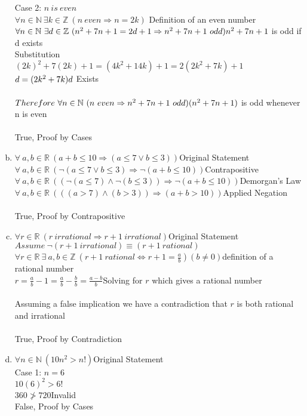 \documentclass[11pt,letterpaper]{article}
\begin{document}
\begin{enumerate}[(a)]
Case 2: $n~is~even$\\
$\forall n\in\mathbb{N}~\exists k\in\mathbb{Z}~(n~even\Rightarrow n =2k)$ \hfill Definition of an even number\\
$\forall n\in\mathbb{N}~\exists d\in\mathbb{Z}~(n^2+7n+1 = 2d+1 \Rightarrow n^2+7n+1~odd)\hfill n^2+7n+1$ is odd if d exists\\
Substitution\\
$(2k)^2 + 7(2k) + 1 = (4k^2 + 14k) + 1 = 2(2k^2 + 7k) + 1$\\
$d = (2k^2 + 7k)\hfill d$ Exists\\
\\
$Therefore~\forall n\in\mathbb{N}~(n~even\Rightarrow n^2 +7n +1~odd)\hfill (n^2 +7n +1)$ is odd whenever n is even\\
\\
True, Proof by Cases
\\
\item
$\forall ~a,b\in\mathbb{R}~(a+b\leq 10\Rightarrow (a\leq 7 \vee b\leq 3))$\hfill Original Statement\\
$\forall ~a,b\in\mathbb{R}~(\neg(a\leq 7 \vee b\leq 3) \Rightarrow \neg(a+b\leq 10))$\hfill Contrapositive\\
$\forall ~a,b\in\mathbb{R}~((\neg(a\leq 7) \wedge \neg(b\leq 3)) \Rightarrow \neg(a+b\leq 10))$\hfill Demorgan's Law\\
$\forall ~a,b\in\mathbb{R}~(((a> 7) \wedge (b> 3)) \Rightarrow (a+b> 10))$\hfill Applied Negation\\
\\
True, Proof by Contrapositive
\clearpage

\item
$\forall r\in\mathbb{R}~(r~irrational\Rightarrow r+1~irrational)$\hfill Original Statement\\
$Assume~\neg(r+1~irrational)\equiv (r+1~rational)$\\
$\forall r\in\mathbb{R}~\exists~a,b\in\mathbb{Z}~(r+1~rational\Leftrightarrow r+1=\frac{a}{b})(b\neq 0)$\hfill definition of a rational number\\
$r= \frac{a}{b}-1=\frac{a}{b}-\frac{b}{b}=\frac{a-b}{b}$\hfill Solving for $r$ which gives a rational number\\
\\
Assuming a false implication we have a contradiction that $r$ is both rational and irrational\\
\\
True, Proof by Contradiction
\\
\item
$\forall n\in\mathbb{N}~(10n^2>n!)$\hfill Original Statement\\
Case 1: $n=6$\\
$10(6)^2 > 6!$\\
$360 \not> 720$\hfill Invalid\\

False, Proof by Cases
\end{enumerate}
\end{document}
